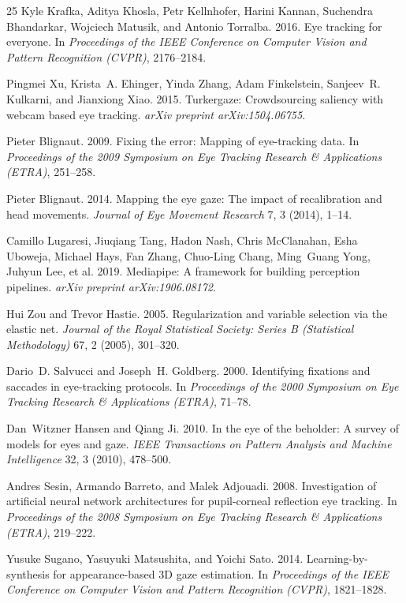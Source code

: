 \documentclass[10pt,twocolumn]{article}
\begin{document}
\begin{thebibliography}{25}
Kyle Krafka, Aditya Khosla, Petr Kellnhofer, Harini Kannan, Suchendra Bhandarkar, Wojciech Matusik, and Antonio Torralba. 2016.
\newblock Eye tracking for everyone.
\newblock In \emph{Proceedings of the IEEE Conference on Computer Vision and Pattern Recognition (CVPR)}, 2176--2184.

Pingmei Xu, Krista~A. Ehinger, Yinda Zhang, Adam Finkelstein, Sanjeev~R. Kulkarni, and Jianxiong Xiao. 2015.
\newblock Turkergaze: Crowdsourcing saliency with webcam based eye tracking.
\newblock \emph{arXiv preprint arXiv:1504.06755}.

Pieter Blignaut. 2009.
\newblock Fixing the error: Mapping of eye-tracking data.
\newblock In \emph{Proceedings of the 2009 Symposium on Eye Tracking Research \& Applications (ETRA)}, 251--258.

Pieter Blignaut. 2014.
\newblock Mapping the eye gaze: The impact of recalibration and head movements.
\newblock \emph{Journal of Eye Movement Research} 7, 3 (2014), 1--14.

Camillo Lugaresi, Jiuqiang Tang, Hadon Nash, Chris McClanahan, Esha Uboweja, Michael Hays, Fan Zhang, Chuo-Ling Chang, Ming~Guang Yong, Juhyun Lee, et al. 2019.
\newblock Mediapipe: A framework for building perception pipelines.
\newblock \emph{arXiv preprint arXiv:1906.08172}.

Hui Zou and Trevor Hastie. 2005.
\newblock Regularization and variable selection via the elastic net.
\newblock \emph{Journal of the Royal Statistical Society: Series B (Statistical Methodology)} 67, 2 (2005), 301--320.

Dario~D. Salvucci and Joseph~H. Goldberg. 2000.
\newblock Identifying fixations and saccades in eye-tracking protocols.
\newblock In \emph{Proceedings of the 2000 Symposium on Eye Tracking Research \& Applications (ETRA)}, 71--78.

Dan~Witzner Hansen and Qiang Ji. 2010.
\newblock In the eye of the beholder: A survey of models for eyes and gaze.
\newblock \emph{IEEE Transactions on Pattern Analysis and Machine Intelligence} 32, 3 (2010), 478--500.

Andres Sesin, Armando Barreto, and Malek Adjouadi. 2008.
\newblock Investigation of artificial neural network architectures for pupil-corneal reflection eye tracking.
\newblock In \emph{Proceedings of the 2008 Symposium on Eye Tracking Research \& Applications (ETRA)}, 219--222.

Yusuke Sugano, Yasuyuki Matsushita, and Yoichi Sato. 2014.
\newblock Learning-by-synthesis for appearance-based 3D gaze estimation.
\newblock In \emph{Proceedings of the IEEE Conference on Computer Vision and Pattern Recognition (CVPR)}, 1821--1828.

\end{thebibliography}
\end{document}
